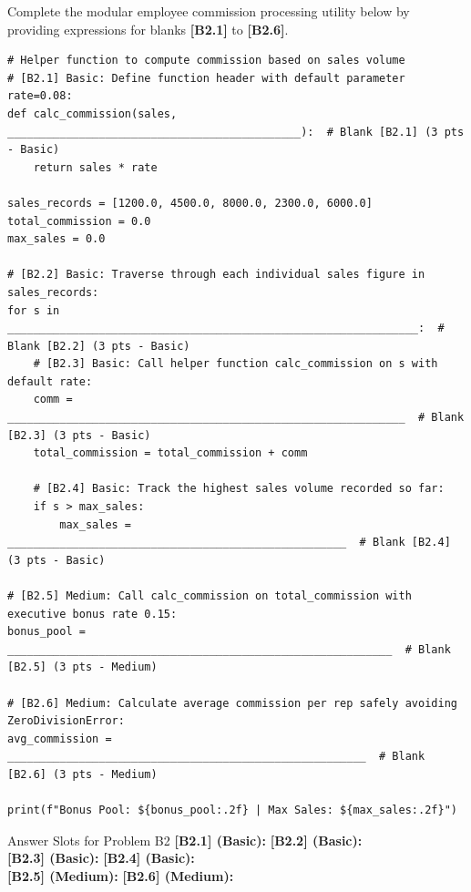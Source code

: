 \documentclass[11pt,a4paper]{article}
\begin{document}
Complete the modular employee commission processing utility below by providing expressions for blanks \textbf{[B2.1]} to \textbf{[B2.6]}.

\begin{lstlisting}
# Helper function to compute commission based on sales volume
# [B2.1] Basic: Define function header with default parameter rate=0.08:
def calc_commission(sales, _____________________________________________):  # Blank [B2.1] (3 pts - Basic)
    return sales * rate

sales_records = [1200.0, 4500.0, 8000.0, 2300.0, 6000.0]
total_commission = 0.0
max_sales = 0.0

# [B2.2] Basic: Traverse through each individual sales figure in sales_records:
for s in _______________________________________________________________:  # Blank [B2.2] (3 pts - Basic)
    # [B2.3] Basic: Call helper function calc_commission on s with default rate:
    comm = _____________________________________________________________  # Blank [B2.3] (3 pts - Basic)
    total_commission = total_commission + comm
    
    # [B2.4] Basic: Track the highest sales volume recorded so far:
    if s > max_sales:
        max_sales = ____________________________________________________  # Blank [B2.4] (3 pts - Basic)

# [B2.5] Medium: Call calc_commission on total_commission with executive bonus rate 0.15:
bonus_pool = ___________________________________________________________  # Blank [B2.5] (3 pts - Medium)

# [B2.6] Medium: Calculate average commission per rep safely avoiding ZeroDivisionError:
avg_commission = _______________________________________________________  # Blank [B2.6] (3 pts - Medium)

print(f"Bonus Pool: ${bonus_pool:.2f} | Max Sales: ${max_sales:.2f}")
\end{lstlisting}

\vspace{0.4mm}
\begin{answerbox}[height=1.8cm]{Answer Slots for Problem B2}
\textbf{[B2.1] (Basic):} \dotfill \quad \textbf{[B2.2] (Basic):} \dotfill\\[1.1mm]
\textbf{[B2.3] (Basic):} \dotfill \quad \textbf{[B2.4] (Basic):} \dotfill\\[1.1mm]
\textbf{[B2.5] (Medium):} \dotfill \quad \textbf{[B2.6] (Medium):} \dotfill
\end{answerbox}

\vspace{0.6mm}
\end{document}
